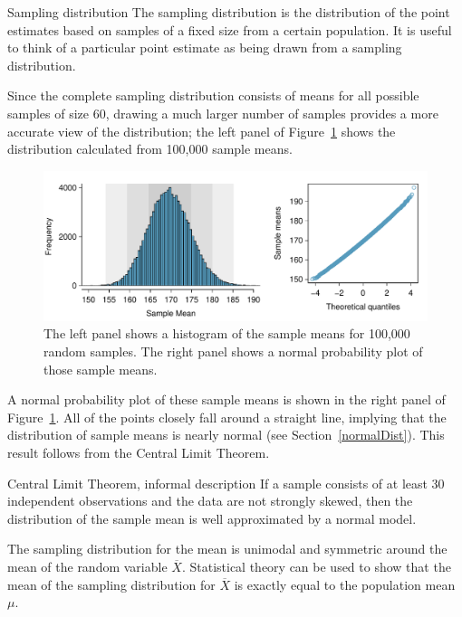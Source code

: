 \begin{onebox}{Sampling distribution}
The sampling distribution is the distribution of the point estimates based on samples of a fixed size from a certain population. It is useful to think of a particular point estimate as being drawn from a sampling distribution.
\end{onebox}

Since the complete sampling distribution consists of means for all possible samples of size 60, drawing a much larger number of samples provides a more accurate view of the distribution; the left panel of Figure~\ref{cdcWeightBigSampDist} shows the distribution calculated from 100,000 sample means. 

\begin{figure}[hht]
 	\centering
 	\includegraphics[width=\textwidth]
 	{ch_03a_inference_foundations_oi_biostat/figures/cdcWeightBigSampDist/cdcWeightBigSampDist.pdf}
 	\caption{The left panel shows a histogram of the sample means for 100,000 random samples. The right panel shows a normal probability plot of those sample means.}
 	\label{cdcWeightBigSampDist}
\end{figure}
 
A normal probability plot of these sample means is shown in the right panel of Figure~\ref{cdcWeightBigSampDist}. All of the points closely fall around a straight line, implying that the distribution of sample means is nearly normal (see Section~\ref{normalDist}). This result follows from the Central Limit Theorem.
 
\begin{onebox}{Central Limit Theorem, informal description}
If a sample consists of at least 30 independent observations and the data are not strongly skewed, then the distribution of the sample mean is well approximated by a normal model.
\end{onebox}

\textD{\newpage}

The sampling distribution for the mean is unimodal and symmetric around the mean of the random variable $\overline{X}$. Statistical theory can be used to show that the mean of the sampling distribution for $\overline{X}$ is exactly equal to the population mean $\mu$. 

